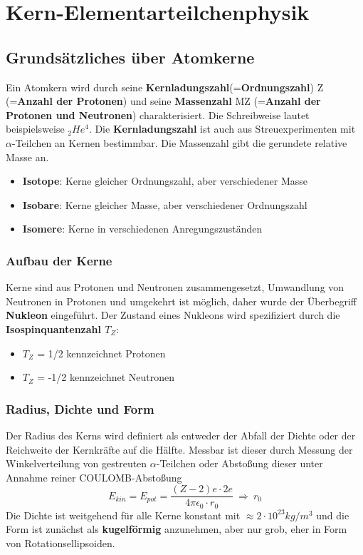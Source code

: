 \documentclass[12pt,a4paper,ngerman]{article}
\begin{document}
\pagebreak

\section{Kern-Elementarteilchenphysik}
\subsection{Grundsätzliches über Atomkerne}
Ein Atomkern wird durch seine \textbf{Kernladungszahl}(=\textbf{Ordnungszahl}) Z (=\textbf{Anzahl der Protonen}) und seine \textbf{Massenzahl} MZ (=\textbf{Anzahl der Protonen und Neutronen}) charakterisiert. Die Schreibweise lautet beispielsweise $_2He^4$. Die \textbf{Kernladungszahl} ist auch aus Streuexperimenten mit $\alpha$-Teilchen an Kernen bestimmbar. Die Massenzahl gibt die gerundete relative Masse an. 
\begin{itemize}
\item \textbf{Isotope}: Kerne gleicher Ordnungszahl, aber verschiedener Masse
\item \textbf{Isobare}: Kerne gleicher Masse, aber verschiedener Ordnungszahl
\item \textbf{Isomere}: Kerne in verschiedenen Anregungszuständen
\end{itemize}

\subsubsection*{Aufbau der Kerne}
Kerne sind aus Protonen und Neutronen zusammengesetzt, Umwandlung von Neutronen in Protonen und umgekehrt ist möglich, daher wurde der Überbegriff \textbf{Nukleon} eingeführt. Der Zustand eines Nukleons wird spezifiziert durch die \textbf{Isospinquantenzahl $T_Z$}:
\begin{itemize}
\item $T_Z$ = 1/2  kennzeichnet Protonen
\item $T_Z$ = -1/2   kennzeichnet Neutronen
\end{itemize}

\subsubsection*{Radius, Dichte und Form}
Der Radius des Kerns wird definiert als entweder der Abfall der Dichte oder der Reichweite der Kernkräfte auf die Hälfte. Messbar ist dieser durch Messung der Winkelverteilung von gestreuten $\alpha$-Teilchen oder Abstoßung dieser unter Annahme reiner COULOMB-Abstoßung 
\begin{equation}
E_{kin} = E_{pot} = \frac{(Z-2)e\cdot2e}{4 \pi \epsilon_0 \cdot r_0} \ \Rightarrow \ r_0
\end{equation}
Die Dichte ist weitgehend für alle Kerne konstant mit $\approx 2 \cdot 10^{23}kg/m^3$ und die Form ist zunächst als \textbf{kugelförmig} anzunehmen, aber nur grob, eher in Form von Rotationsellipsoiden.
\end{document}
